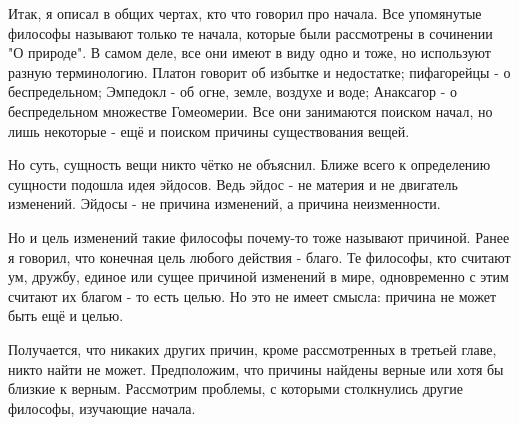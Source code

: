 \documentclass{article}
\begin{document}
Итак, я описал в общих чертах, кто что говорил про начала. Все упомянутые философы называют только те начала, которые были рассмотрены в сочинении "О природе". В самом деле, все они имеют в виду одно и тоже, но используют разную терминологию. Платон говорит об избытке и недостатке; пифагорейцы - о беспредельном; Эмпедокл - об огне, земле, воздухе и воде; Анаксагор - о беспредельном множестве Гомеомерии. Все они занимаются поиском начал, но лишь некоторые - ещё и поиском причины существования вещей.

Но суть, сущность вещи никто чётко не объяснил. Ближе всего к определению сущности подошла идея эйдосов. Ведь эйдос - не материя и не двигатель изменений. Эйдосы - не причина изменений, а причина неизменности.

Но и цель изменений такие философы почему-то тоже называют причиной. Ранее я говорил, что конечная цель любого действия - благо. Те философы, кто считают ум, дружбу, единое или сущее причиной изменений в мире, одновременно с этим считают их благом - то есть целью. Но это не имеет смысла: причина не может быть ещё и целью.

Получается, что никаких других причин, кроме рассмотренных в третьей главе, никто найти не может. Предположим, что причины найдены верные или хотя бы близкие к верным. Рассмотрим проблемы, с которыми столкнулись другие философы, изучающие начала.
\end{document}

